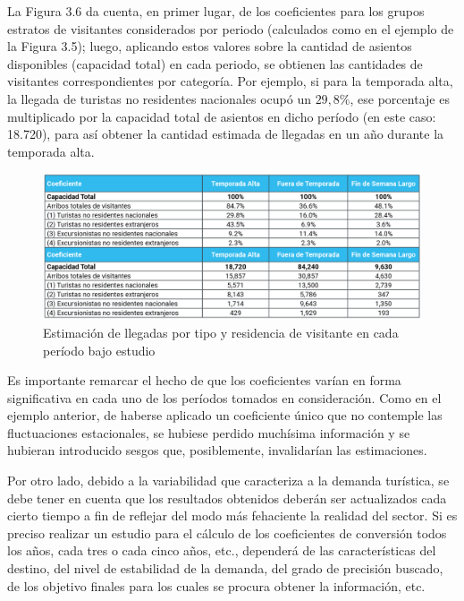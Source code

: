 \documentclass[
]{book}
\begin{document}
La Figura 3.6 da cuenta, en primer lugar, de los coeficientes para los grupos estratos de visitantes considerados por periodo (calculados como en el ejemplo de la Figura 3.5); luego, aplicando estos valores sobre la cantidad de asientos disponibles (capacidad total) en cada periodo, se obtienen las cantidades de visitantes correspondientes por categoría. Por ejemplo, si para la temporada alta, la llegada de turistas no residentes nacionales ocupó un \(29,8\%\), ese porcentaje es multiplicado por la capacidad total de asientos en dicho período (en este caso: 18.720), para así obtener la cantidad estimada de llegadas en un año durante la temporada alta.

\begin{figure}

{\centering \includegraphics[width=1\linewidth]{imagenes/figura08} 

}

\caption{Estimación de llegadas por tipo y residencia de visitante en cada período bajo estudio}\label{fig:llegadasportipo}
\end{figure}

Es importante remarcar el hecho de que los coeficientes varían en forma significativa en cada uno de los períodos tomados en consideración. Como en el ejemplo anterior, de haberse aplicado un coeficiente único que no contemple las fluctuaciones estacionales, se hubiese perdido muchísima información y se hubieran introducido sesgos que, posiblemente, invalidarían las estimaciones.

Por otro lado, debido a la variabilidad que caracteriza a la demanda turística, se debe tener en cuenta que los resultados obtenidos deberán ser actualizados cada cierto tiempo a fin de reflejar del modo más fehaciente la realidad del sector. Si es preciso realizar un estudio para el cálculo de los coeficientes de conversión todos los años, cada tres o cada cinco años, etc., dependerá de las características del destino, del nivel de estabilidad de la demanda, del grado de precisión buscado, de los objetivo finales para los cuales se procura obtener la información, etc.
\end{document}
